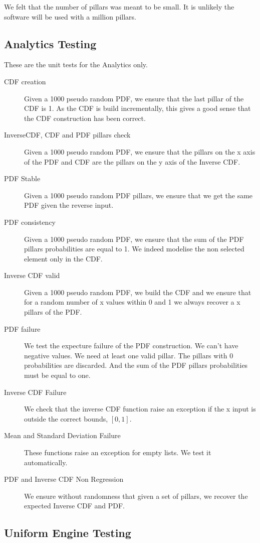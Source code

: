 \documentclass[12pt,a4paper,article]{memoir} %
\begin{document}
We felt that the number of pillars was meant to be small. It is unlikely
the software will be used with a million pillars. 

\subsection{Analytics Testing} 
These are the unit tests for the Analytics only.
\begin{description}
	\item [CDF creation]
		Given a 1000 pseudo random PDF, we ensure 
		that the last pillar of the CDF is 1.
		As the CDF is build incrementally, this gives a good sense that
		the CDF construction has been correct.
	\item [InverseCDF, CDF and PDF pillars check]
		Given a 1000 pseudo random PDF, we ensure that
		the pillars on the x axis of the PDF and CDF are the pillars on the y
		axis of the Inverse CDF.
	\item [PDF Stable]
		Given a 1000 pseudo random PDF pillars, 
		we ensure that we get the same PDF given the reverse input.
	\item [PDF consistency]
		Given a 1000 pseudo random PDF, 
		we ensure that the sum of the PDF pillars probabilities are 
		equal to 1. We indeed modelise the non selected element
		only in the CDF.
	\item [Inverse CDF valid]
		Given a 1000 pseudo random PDF,
		we build the CDF and we ensure that for a random number of
		x values within 0 and 1 we always recover a x pillars of the PDF.
	\item [PDF failure]
		We test the expecture failure of the PDF construction. 
		We can't have negative values. We need at least one valid pillar.
		The pillars with 0 probabilities are discarded.
		And the sum of the PDF pillars probabilities must be 
		equal to one.
	\item [Inverse CDF Failure]
		We check that the inverse CDF function raise an
		exception if the x input is outside the correct bounds, 
		$\left[0, 1\right]$.
	\item [Mean and Standard Deviation Failure]
		These functions raise an exception for empty lists.
		We test it automatically.
	\item [PDF and Inverse CDF Non Regression]
		We ensure without randomness that given a set of pillars,
		we recover the expected Inverse CDF and PDF.
\end{description}
\subsection{Uniform Engine Testing} 
\end{document}
